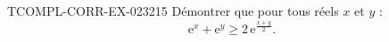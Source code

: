 \begin{exercice}{TCOMPL-CORR-EX-023}{2}{15}
Démontrer que pour tous réels $x$ et $y$ :
\[ \mathrm{e}^x + \mathrm{e}^y \geq 2\,\mathrm{e}^{\frac{x+y}{2}}. \]

\end{exercice}

